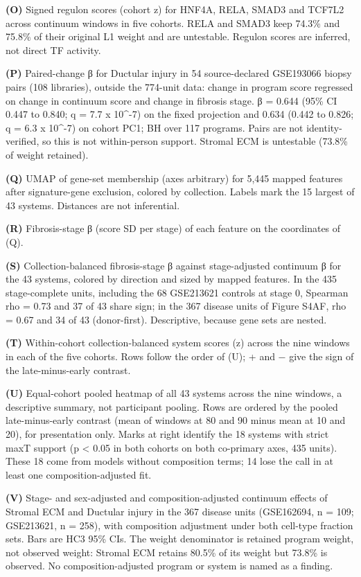 \textbf{(O)} Signed regulon scores (cohort z) for HNF4A, RELA, SMAD3 and TCF7L2 across continuum windows in five cohorts. RELA and SMAD3 keep 74.3\% and 75.8\% of their original L1 weight and are untestable. Regulon scores are inferred, not direct TF activity.

\textbf{(P)} Paired-change β for Ductular injury in 54 source-declared GSE193066 biopsy pairs (108 libraries), outside the 774-unit data: change in program score regressed on change in continuum score and change in fibrosis stage. β = 0.644 (95\% CI 0.447 to 0.840; q = 7.7 x 10\^{}-7) on the fixed projection and 0.634 (0.442 to 0.826; q = 6.3 x 10\^{}-7) on cohort PC1; BH over 117 programs. Pairs are not identity-verified, so this is not within-person support. Stromal ECM is untestable (73.8\% of weight retained).

\textbf{(Q)} UMAP of gene-set membership (axes arbitrary) for 5,445 mapped features after signature-gene exclusion, colored by collection. Labels mark the 15 largest of 43 systems. Distances are not inferential.

\textbf{(R)} Fibrosis-stage β (score SD per stage) of each feature on the coordinates of (Q).

\textbf{(S)} Collection-balanced fibrosis-stage β against stage-adjusted continuum β for the 43 systems, colored by direction and sized by mapped features. In the 435 stage-complete units, including the 68 GSE213621 controls at stage 0, Spearman rho = 0.73 and 37 of 43 share sign; in the 367 disease units of Figure S4AF, rho = 0.67 and 34 of 43 (donor-first). Descriptive, because gene sets are nested.

\textbf{(T)} Within-cohort collection-balanced system scores (z) across the nine windows in each of the five cohorts. Rows follow the order of (U); + and − give the sign of the late-minus-early contrast.

\textbf{(U)} Equal-cohort pooled heatmap of all 43 systems across the nine windows, a descriptive summary, not participant pooling. Rows are ordered by the pooled late-minus-early contrast (mean of windows at 80 and 90 minus mean at 10 and 20), for presentation only. Marks at right identify the 18 systems with strict maxT support (p \textless{} 0.05 in both cohorts on both co-primary axes, 435 units). These 18 come from models without composition terms; 14 lose the call in at least one composition-adjusted fit.

\textbf{(V)} Stage- and sex-adjusted and composition-adjusted continuum effects of Stromal ECM and Ductular injury in the 367 disease units (GSE162694, n = 109; GSE213621, n = 258), with composition adjustment under both cell-type fraction sets. Bars are HC3 95\% CIs. The weight denominator is retained program weight, not observed weight: Stromal ECM retains 80.5\% of its weight but 73.8\% is observed. No composition-adjusted program or system is named as a finding.


